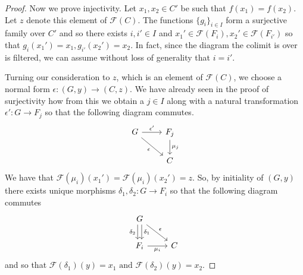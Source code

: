\documentclass[12pt]{article}
\theoremstyle{plain}
\theoremstyle{definition}
\newcommand{\scr}[1]{\mathscr{#1}}
\newcommand{\lto}{\longrightarrow}
\begin{document}
\begin{proof}
		Now we prove injectivity. Let $x_1,x_2 \in C'$ be such that $f(x_1) = f(x_2)$. Let $z$ denote this element of $\scr{F}(C)$. The functions $\{ g_i\}_{i \in I}$ form a surjective family over $C'$ and so there exists $i,i' \in I$ and $x_1' \in \scr{F}(F_i), x_2' \in \scr{F}(F_{i'})$ so that $g_i(x_1') = x_1, g_{i'}(x_2') = x_2$. In fact, since the diagram the colimit is over is filtered, we can assume without loss of generality that $i = i'$.
		
		Turning our consideration to $z$, which is an element of $\scr{F}(C)$, we choose a normal form $\epsilon: (G, y) \lto (C, z)$. We have already seen in the proof of surjectivity how from this we obtain a $j \in I$ along with a natural transformation $\epsilon': G \lto F_j$ so that the following diagram commutes.
		\begin{equation}\label{eq:by_finiteness}
			\begin{tikzcd}
				G\arrow[r,"{\epsilon'}"]\arrow[dr,swap,"{\epsilon}"] & F_j\arrow[d,"{\mu_j}"]\\
				& C
				\end{tikzcd}
			\end{equation}
		We have that $\scr{F}(\mu_i)(x_1') = \scr{F}(\mu_i)(x_2') = z$. So, by initiality of $(G,y)$ there exists unique morphisms $\delta_1,\delta_2: G \lto F_i$ so that the following diagram commutes
		\begin{equation}\label{eq:by_normality}
		\begin{tikzcd}
			G\arrow[dr,"{\epsilon}"]\arrow[d,swap, shift right, "{\delta_2}"]\arrow[d,shift left, "{\delta_1}"]\\
			F_i\arrow[r,swap,"{\mu_i}"] & C
			\end{tikzcd}
		\end{equation}
		and so that $
			\scr{F}(\delta_1)(y) = x_1\text{ and }\scr{F}(\delta_2)(y) = x_2$.
		

\end{proof}
\end{document}
